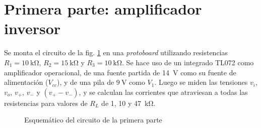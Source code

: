 \section{Primera parte: amplificador inversor}

Se monta el circuito de la fig. \ref{fig:1:esquema} en una \textit{protoboard}
utilizando resistencias $R_1 = \SI{10}{\kilo\ohm}$, $R_2 = \SI{15}{\kilo\ohm}$ y
$R_3 = \SI{10}{\kilo\ohm}$. Se hace uso de un integrado TL072 como amplificador
operacional, de una fuente partida de \SI{14}{\volt} como su fuente de 
alimentación ($V_{cc}$), y de una pila de $\SI{9}{\volt}$ como $V_1$.
Luego se miden las tensiones $v_i$, $v_o$, $v_{+}$,
$v_{-}$ y $\left(v_{+} - v_{-}\right)$, y se calculan las corrientes que
atraviesan a todas las resistencias para valores de $R_L$ de 1, 10 y
\SI{47}{\kilo\ohm}.

\begin{figure}[H]
    \centering
    
    \caption{Esquemático del circuito de la primera parte}
    \label{fig:1:esquema}
\end{figure}







\newpage


% 

